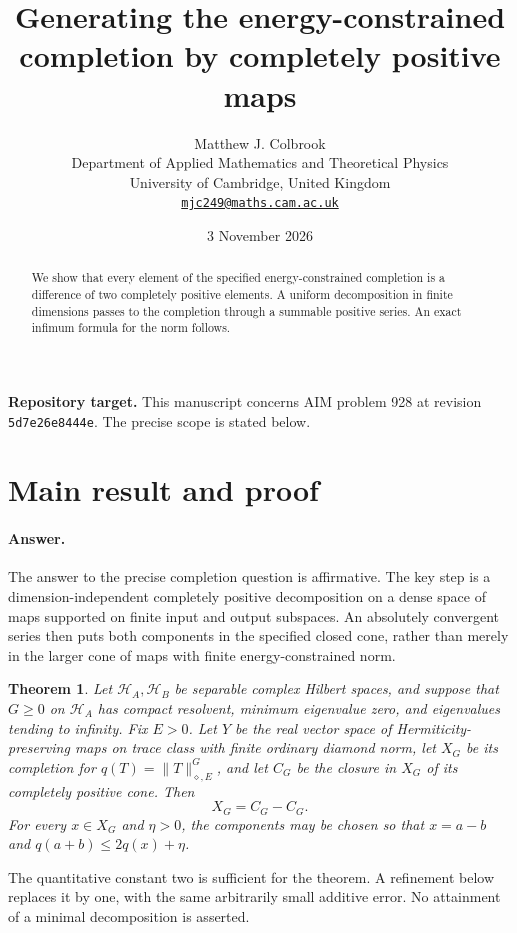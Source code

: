 \documentclass[11pt,a4paper]{article}
\title{\textbf{Generating the energy-constrained completion by completely positive maps}}
\author{Matthew J. Colbrook\\[3pt]
{\small Department of Applied Mathematics and Theoretical Physics}\\
{\small University of Cambridge, United Kingdom}\\
{\small\href{mailto:mjc249@maths.cam.ac.uk}{\texttt{mjc249@maths.cam.ac.uk}}}}
\date{3 November 2026}
\newtheorem{theorem}{Theorem}[section]
\theoremstyle{remark}
\begin{document}
\maketitle
\begin{abstract}
We show that every element of the specified energy-constrained completion is a difference of two completely positive elements. A uniform decomposition in finite dimensions passes to the completion through a summable positive series. An exact infimum formula for the norm follows.
\end{abstract}
\noindent\textbf{Repository target.}
This manuscript concerns AIM problem 928 at revision
\texttt{5d7e26e8444e}. The precise scope is stated below.
\medskip

\section{Main result and proof}
\label{sec:928}

\paragraph{Answer.} The answer to the precise completion question is affirmative.
The key step is a dimension-independent completely positive decomposition on a
dense space of maps supported on finite input and output subspaces. An
absolutely convergent series then puts both components in the specified
closed cone, rather than merely in the larger cone of maps with finite
energy-constrained norm.

\begin{theorem}\label{thm:928}
Let $\mathcal H_A,\mathcal H_B$ be separable complex Hilbert spaces, and suppose
that $G\ge0$ on $\mathcal H_A$ has compact resolvent, minimum eigenvalue zero,
and eigenvalues tending to infinity. Fix $E>0$. Let $Y$ be the real vector
space of Hermiticity-preserving maps on trace class with finite ordinary
diamond norm, let $X_G$ be its completion for
$q(T)=\|T\|_{\diamond,E}^{G}$, and let $C_G$ be the closure in $X_G$ of its
completely positive cone. Then
\[
 X_G=C_G-C_G.
\]
For every $x\in X_G$ and $\eta>0$, the components may be chosen so that
$x=a-b$ and $q(a+b)\le 2q(x)+\eta$.
\end{theorem}

The quantitative constant two is sufficient for the theorem. A refinement
below replaces it by one, with the same arbitrarily small additive error.
No attainment of a minimal decomposition is asserted.
\end{document}
